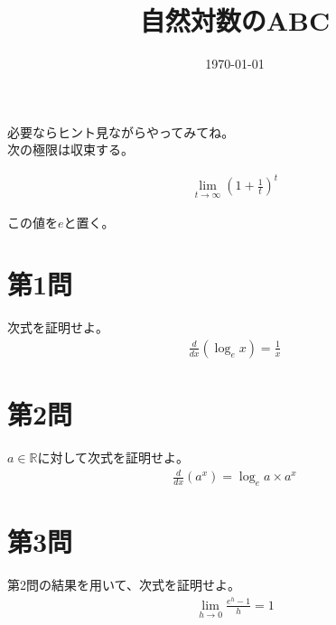 \documentclass[11pt,a4paper]{jsarticle}
\title{自然対数のABC}
\date{\today}
\begin{document}
\maketitle

必要ならヒント見ながらやってみてね。\\

次の極限は収束する。

\begin{eqnarray}
    \lim_{t \rightarrow \infty}\left( 1+\frac{1}{t} \right)^t \nonumber    
\end{eqnarray}

この値を$e$と置く。

\section*{第1問}
次式を証明せよ。
\begin{eqnarray}
    \frac{d}{dx}\left( \log_e x \right) = \frac{1}{x} \nonumber
\end{eqnarray}

\section*{第2問}
$a \in \mathbb{R}$に対して次式を証明せよ。
\begin{eqnarray}
    \frac{d}{dx}\left( a^x \right) = \log_e a \times a^x \nonumber
\end{eqnarray}

\section*{第3問}
第2問の結果を用いて、次式を証明せよ。
\begin{eqnarray}
    \lim_{h \rightarrow 0} \frac{e^h-1}{h} = 1 \nonumber
\end{eqnarray}
\end{document}
